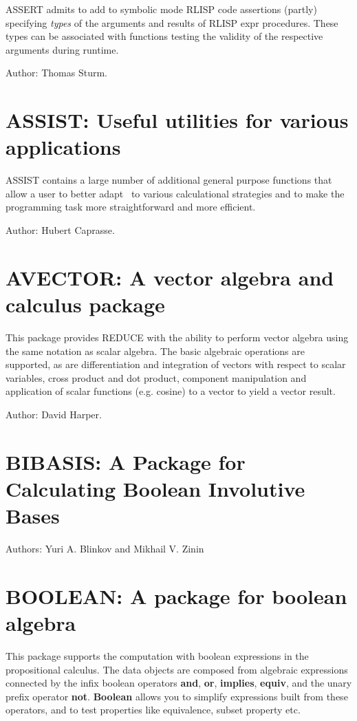ASSERT admits to add to symbolic mode RLISP code assertions (partly)          
specifying \emph{types} of the arguments and results of RLISP expr
procedures. These types can be associated with functions testing the
validity of the respective arguments during runtime.

Author: Thomas Sturm.

\section{ASSIST: Useful utilities for various applications} 
\label{ASSIST}\hypertarget{ASSIST}{}

ASSIST contains a large number of additional general purpose functions
that allow a user to better adapt \REDUCE\ to various calculational
strategies and to make the programming task more straightforward and more
efficient.

Author: Hubert Caprasse.

\section{AVECTOR: A vector algebra and calculus package} 

This package provides REDUCE with the ability to perform vector algebra
using the same notation as scalar algebra.  The basic algebraic operations
are supported, as are differentiation and integration of vectors with
respect to scalar variables, cross product and dot product, component
manipulation and application of scalar functions (e.g. cosine) to a vector
to yield a vector result.

Author: David Harper.

\section{BIBASIS: A Package for Calculating Boolean Involutive Bases}
 \label{BIBASIS}

Authors: Yuri A. Blinkov and Mikhail V. Zinin


\section{BOOLEAN: A package for boolean algebra} 

This package supports the computation with boolean expressions in the
propositional calculus.  The data objects are composed from algebraic
expressions connected by the infix boolean operators {\bf and}, {\bf or},
{\bf implies}, {\bf equiv}, and the unary prefix operator {\bf not}.
{\bf Boolean} allows you to simplify expressions built from these
operators, and to test properties like equivalence, subset property etc.


